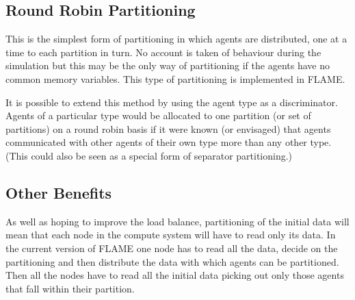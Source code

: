 \subsection{Round Robin Partitioning}

This is the simplest form of partitioning in which agents are distributed, one at a time to each partition in turn. No account is taken of behaviour during the simulation but this may be the only way of partitioning if the agents have no common memory variables. This type of partitioning is implemented in FLAME.

It is possible to extend this method by using the agent type as a discriminator. Agents of a particular type would be allocated to one partition (or set of partitions) on a round robin basis if it were known (or envisaged) that agents communicated with other agents of their own type more than any other type. (This could also be seen as a special form of separator partitioning.)

\subsection{Other Benefits}

As well as hoping to improve the load balance, partitioning of the initial data will mean that each node in the compute system will have to read only its data. In the current version of FLAME one node has to read all the data, decide on the partitioning and then distribute the data with which agents can be partitioned. Then all the nodes have to read all the initial data picking out only those agents that fall within their partition.


